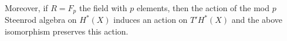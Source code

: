 Moreover, if $R = F_p$ the field with $p$ elements, then the action of the mod $p$ Steenrod algebra on $H^*(X)$ induces an action on $T'H^*(X)$ and the above isomorphism preserves this action.
